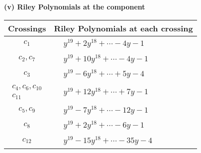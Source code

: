 \documentclass[1p]{elsarticle_modified}
\theoremstyle{definition}
\begin{document}
\newpage\renewcommand{\arraystretch}{1}
\flushleft \textbf{(v) Riley Polynomials at the component}\newline \\
\begin{tabular}{m{50pt}|m{274pt}}
Crossings & \hspace{64pt}Riley Polynomials at each crossing \\
\hline $$\begin{aligned}c_{1}\end{aligned}$$&$\begin{aligned}
&y^{19}+2 y^{18}+\cdots-4 y-1
\end{aligned}$\\
\hline $$\begin{aligned}c_{2},c_{7}\end{aligned}$$&$\begin{aligned}
&y^{19}+10 y^{18}+\cdots-4 y-1
\end{aligned}$\\
\hline $$\begin{aligned}c_{3}\end{aligned}$$&$\begin{aligned}
&y^{19}-6 y^{18}+\cdots+5 y-4
\end{aligned}$\\
\hline $$\begin{aligned}c_{4},c_{6},c_{10}\\c_{11}\end{aligned}$$&$\begin{aligned}
&y^{19}+12 y^{18}+\cdots+7 y-1
\end{aligned}$\\
\hline $$\begin{aligned}c_{5},c_{9}\end{aligned}$$&$\begin{aligned}
&y^{19}-7 y^{18}+\cdots-12 y-1
\end{aligned}$\\
\hline $$\begin{aligned}c_{8}\end{aligned}$$&$\begin{aligned}
&y^{19}+2 y^{18}+\cdots-6 y-1
\end{aligned}$\\
\hline $$\begin{aligned}c_{12}\end{aligned}$$&$\begin{aligned}
&y^{19}-15 y^{18}+\cdots-35 y-4
\end{aligned}$\\
\hline
\end{tabular}\\~\\
\end{document}
